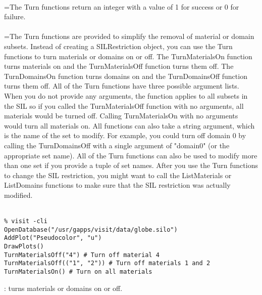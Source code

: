 \documentclass[10pt,a4paper]{report}
\begin{document}
 \\ 
\hangindent=\parindent The Turn functions return an integer with a value of 1 for success or 0 for failure. \\[-3mm] 

 \\ 
\hangindent=\parindent The Turn functions are provided to simplify the removal of material or domain subsets. Instead of creating a SILRestriction object, you can use the Turn functions to turn materials or domains on or off. The TurnMaterialsOn function turns materials on and the TurnMaterialsOff function turns them off. The TurnDomainsOn function turns domains on and the TurnDomainsOff function turns them off. All of the Turn functions have three possible argument lists. When you do not provide any arguments, the function applies to all subsets in the SIL so if you called the TurnMaterialsOff function with no arguments, all materials would be turned off. Calling TurnMaterialsOn with no arguments would turn all materials on. All functions can also take a string argument, which is the name of the set to modify. For example, you could turn off domain 0 by calling the TurnDomainsOff with a single argument of "domain0" (or the appropriate set name). All of the Turn functions can also be used to modify more than one set if you provide a tuple of set names. After you use the Turn functions to change the SIL restriction, you might want to call the ListMaterials or ListDomains functions to make sure that the SIL restriction was actually modified. \\[-3mm] 

\\[-6mm]
\begin{verbatim}% visit -cli
OpenDatabase("/usr/gapps/visit/data/globe.silo")
AddPlot("Pseudocolor", "u")
DrawPlots()
TurnMaterialsOff("4") # Turn off material 4
TurnMaterialsOff(("1", "2")) # Turn off materials 1 and 2
TurnMaterialsOn() # Turn on all materials
\end{verbatim}
\newpage


{}
: turns materials or domains on or off.\\[-3mm]
\end{document}
